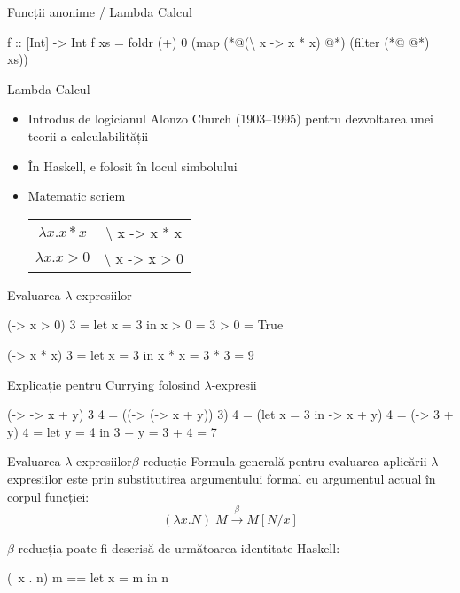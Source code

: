 \documentclass[handout,xcolor=pdftex,romanian,colorlinks]{beamer}
\begin{document}
\begin{frame}[fragile]{Funcții anonime / Lambda Calcul}
\begin{asciihs}
f :: [Int] -> Int
f xs = foldr (+) 0 
         (map (*@\color{blue}(\textbackslash\; x -> x * x) @*) 
            (filter (*@\color{blue}{(\textbackslash\; x -> x > 0)} @*) xs))
\end{asciihs}

\begin{block}{Lambda Calcul}
\begin{itemize}
\item Introdus de logicianul Alonzo Church (1903--1995) pentru dezvoltarea unei teorii a calculabilității
\item În Haskell, \structure{\textbackslash} e folosit în locul simbolului \structure{$\lambda$}
\item Matematic scriem 
\begin{tabular}{c@{ în loc de }c}
$\lambda x. x * x$ & \textbackslash\; x -> x * x
\\
$\lambda x. x > 0$ & \textbackslash\; x -> x > 0
\end{tabular}
\end{itemize}
\end{block}
\end{frame}

\begin{frame}[fragile]{Evaluarea $\lambda$-expresiilor}
\begin{asciihs}
  (\x -> x > 0) 3
=
  let x = 3 in x > 0
=
  3 > 0
=
  True


  (\x -> x * x) 3
=
  let x = 3 in x * x
=
  3 * 3
=
  9
\end{asciihs}
\end{frame}

\begin{frame}[fragile]{Explicație pentru Currying folosind $\lambda$-expresii }
\begin{asciihs}
  (\x -> \y -> x + y) 3 4
=
  ((\x -> (\y -> x + y)) 3) 4
=
  (let x = 3 in \y -> x + y) 4
=
  (\y -> 3 + y) 4
=
  let y = 4 in 3 + y
=
  3 + 4
=
  7
\end{asciihs}
\end{frame}


\begin{frame}[fragile]{Evaluarea $\lambda$-expresiilor}{$\beta$-reducție}
Formula generală pentru evaluarea aplicării $\lambda$-expresiilor este prin substitutirea
argumentului formal cu argumentul actual în corpul funcției:
\[(\lambda x . N)\; M  \xrightarrow{\beta} M[N / x]\]

$\beta$-reducția poate fi descrisă de următoarea identitate Haskell:
\begin{asciihs}
(\ x . n) m == let x = m in n
\end{asciihs}
\end{frame}
\end{document}
